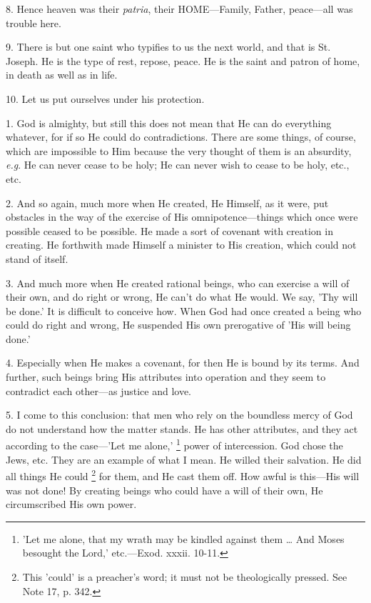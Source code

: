 8. Hence heaven was their \emph{patria}, their HOME—Family,
Father, peace—all was trouble here.

9. There is but one saint who typifies to us the
next world, and that is St. Joseph. He is the type of rest, repose,
peace. He is the saint and patron of home, in death as well as in
life.

10. Let us put ourselves under his protection.


1. God is almighty, but still this does not mean
that He can do everything whatever, for if so He could do
contradictions. There are some things, of course, which are impossible
to Him because the very thought of them is an absurdity, \emph{e.g}.
He can never cease to be holy; He can never wish to cease to be holy,
etc., etc.

2. And so again, much more when He created, He Himself, as it were, put obstacles in the way of the exercise of
His omnipotence—things which once were possible ceased to be
possible. He made a sort of covenant with creation in creating. He
forthwith made Himself a minister to His creation, which could not
stand of itself.

3. And much more when He created rational beings,
who can exercise a will of their own, and do right or wrong, He can't
do what He would. We say, 'Thy will be done.' It is difficult to
conceive how. When God had once created a being who could do right and
wrong, He suspended His own prerogative of 'His will being done.'

4. Especially when He makes a covenant, for then
He is bound by its terms. And further, such beings bring His
attributes into operation and they seem to contradict each other—as
justice and love.

5. I come to this conclusion: that men who rely
on the boundless mercy of God do not understand how the matter stands.
He has other attributes, and they act according to the case—'Let me
alone,' \footnote{'Let me alone, that my
wrath may be kindled against them … And Moses besought the Lord,'
etc.—Exod. xxxii. 10-11.} power of
intercession. God chose the Jews, etc. They are an example of what I
mean. He willed their salvation. He did all things He could \footnote{This 'could' is a
preacher's word; it must not be theologically pressed. See Note
17, p.
342.} for them, and He cast them off. How awful is this—His will
was not done! By creating beings who could have a will of their own,
He circumscribed His own power.

